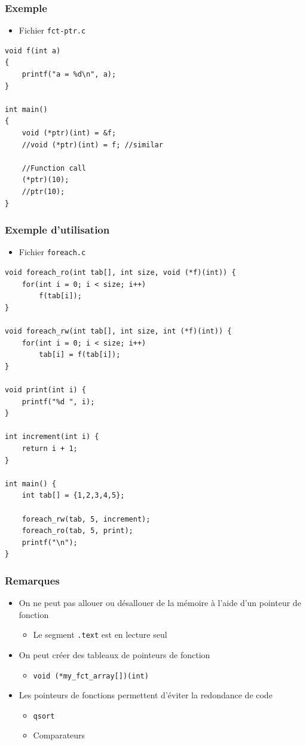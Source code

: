 \begin{frame}[containsverbatim]
\frametitle{Exemple}
\begin{itemize}
\item Fichier \texttt{fct-ptr.c}
\end{itemize}
\begin{lstlisting}
void f(int a) 
{ 
	printf("a = %d\n", a); 
} 

int main() 
{ 
	void (*ptr)(int) = &f;
	//void (*ptr)(int) = f; //similar	

	//Function call
	(*ptr)(10); 
	//ptr(10);
} 
\end{lstlisting}
\end{frame}

\begin{frame}[containsverbatim]
\frametitle{Exemple d'utilisation}
\begin{itemize}
\item Fichier \texttt{foreach.c}
\end{itemize}
\begin{lstlisting}
void foreach_ro(int tab[], int size, void (*f)(int)) {
	for(int i = 0; i < size; i++)
		f(tab[i]);
}

void foreach_rw(int tab[], int size, int (*f)(int)) {
	for(int i = 0; i < size; i++)
		tab[i] = f(tab[i]);
}

void print(int i) {
	printf("%d ", i);
}

int increment(int i) {
	return i + 1;
}

int main() {
	int tab[] = {1,2,3,4,5};
	
	foreach_rw(tab, 5, increment);
	foreach_ro(tab, 5, print);
	printf("\n");
}
\end{lstlisting}
\end{frame}

\begin{frame}
\frametitle{Remarques}
\begin{itemize}[<+->]
\item On ne peut pas allouer ou désallouer de la mémoire à l'aide d'un pointeur de fonction
	\begin{itemize}
	\item Le segment \texttt{.text} est en lecture seul
	\end{itemize}
\item On peut créer des tableaux de pointeurs de fonction
	\begin{itemize}
	\item \lstinline|void (*my_fct_array[])(int)|
	\end{itemize}
\item Les pointeurs de fonctions permettent d'éviter la redondance de code
	\begin{itemize}
	\item \texttt{qsort}
	\item Comparateurs
	\end{itemize}
\end{itemize}
\end{frame}

